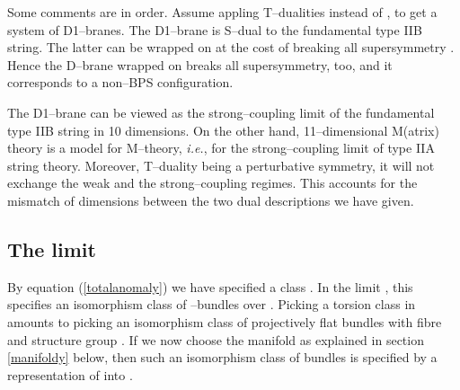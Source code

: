 \documentclass[a4paper,a4paper]{article}
\begin{document}
Some comments are in order. Assume appling \coordHE{} T--dualities 
instead of \coordHE{}, to get a system of D1--branes. The D1--brane is S--dual to the  
fundamental type IIB string. The latter can be wrapped on \myHighlight{$\Sigma$}\coordHE{}  
at the cost of breaking  all supersymmetry \cite{RUSSO}. Hence the  
D\coordHE{}--brane wrapped on \myHighlight{$\Sigma$}\coordHE{} breaks all supersymmetry,  too, and it  
corresponds to a non--BPS configuration.

The D1--brane can be viewed as the strong--coupling limit 
of the fundamental type IIB string in 10 dimensions. On the other hand, 
11--dimensional M(atrix) theory is a model for M--theory, {\it i.e.}, 
for the strong--coupling limit of type IIA string theory. Moreover, 
T--duality being a perturbative symmetry, it will not exchange the weak 
and the strong--coupling regimes. This accounts for the mismatch 
of dimensions between the two dual descriptions we have given.  
  
\subsection{The limit \coordHE{}}\label{limit}  

By equation (\ref{totalanomaly}) we have specified a class \coordHE{}. 
In the limit \coordHE{}, this \coordHE{} specifies 
an isomorphism class of \coordHE{}--bundles over \coordHE{}. 
Picking a torsion class in \coordHE{} amounts to picking an 
isomorphism class of projectively flat bundles \coordHE{}
with fibre \coordHE{} and structure group \coordHE{}. If we now choose 
the manifold \coordHE{} as explained in section \ref{manifoldy} below, 
then such an isomorphism class of bundles is specified by a representation 
of \coordHE{} into \coordHE{}.
\end{document}
